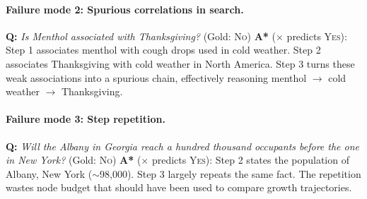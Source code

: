 \documentclass[10pt]{article}
\begin{document}
\paragraph{Failure mode 2: Spurious correlations in search.}

\begin{examplebox}[title=StrategyQA --- Spurious Correlation]
\textbf{Q:} \emph{Is Menthol associated with Thanksgiving?} \quad (Gold: \textsc{No})
\tcblower
\textbf{A*} ($\times$ predicts \textsc{Yes}): Step 1 associates menthol with cough drops used in cold weather. Step 2 associates Thanksgiving with cold weather in North America. Step 3 turns these weak associations into a spurious chain, effectively reasoning menthol $\rightarrow$ cold weather $\rightarrow$ Thanksgiving.
\end{examplebox}

\paragraph{Failure mode 3: Step repetition.}

\begin{examplebox}[title=StrategyQA --- Step Repetition]
\textbf{Q:} \emph{Will the Albany in Georgia reach a hundred thousand occupants before the one in New York?} \quad (Gold: \textsc{No})
\tcblower
\textbf{A*} ($\times$ predicts \textsc{Yes}): Step 2 states the population of Albany, New York ($\sim$98{,}000). Step 3 largely repeats the same fact. The repetition wastes node budget that should have been used to compare growth trajectories.
\end{examplebox}
\end{document}
